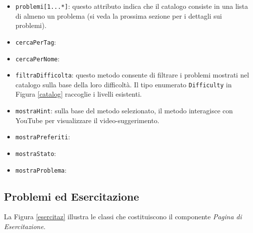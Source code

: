 \documentclass[11pt, a4paper]{article}
\theoremstyle{definition} %
\begin{document}
\begin{itemize}
    \item \texttt{problemi[1...*]}: questo attributo indica che il catalogo
    consiste in una lista di almeno un problema (si veda la prossima sezione
    per i dettagli sui problemi).
    
    \item \texttt{cercaPerTag}:
    \item \texttt{cercaPerNome}:
    \item \texttt{filtraDifficolta}: questo metodo consente di filtrare i
    problemi mostrati nel catalogo sulla base della loro difficoltà. Il
    tipo enumerato \texttt{Difficulty} in Figura \ref{catalog}
    raccoglie i livelli esistenti.

    \item \texttt{mostraHint}: sulla base del metodo selezionato, il metodo
    interagisce con YouTube per visualizzare il video-suggerimento.

    \item \texttt{mostraPreferiti}:
    \item \texttt{mostraStato}:
    \item \texttt{mostraProblema}:
\end{itemize}



\newpage
\subsection{Problemi ed Esercitazione}
La Figura \ref{esercitaz} illustra le classi che costituiscono il componente
\textit{Pagina di Esercitazione}.
\end{document}
